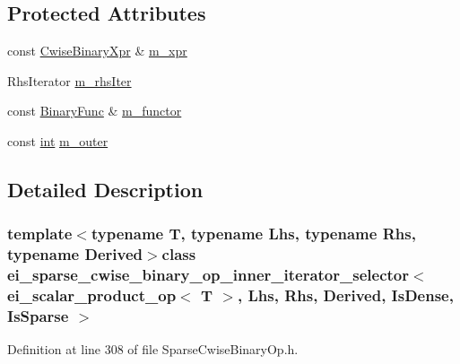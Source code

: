\subsection*{Protected Attributes}
\begin{DoxyCompactItemize}
\item 
const \hyperlink{class_sparse_cwise_binary_op}{Cwise\-Binary\-Xpr} \& \hyperlink{classei__sparse__cwise__binary__op__inner__iterator__selector_3_01ei__scalar__product__op_3_01_tea59c78454e1066b1083644fef716fd4_adb80345e69e67b853b7ccef6e1120792}{m\-\_\-xpr}
\item 
Rhs\-Iterator \hyperlink{classei__sparse__cwise__binary__op__inner__iterator__selector_3_01ei__scalar__product__op_3_01_tea59c78454e1066b1083644fef716fd4_a2799bac446994bca03e1c027dac5d9eb}{m\-\_\-rhs\-Iter}
\item 
const \hyperlink{structei__scalar__product__op}{Binary\-Func} \& \hyperlink{classei__sparse__cwise__binary__op__inner__iterator__selector_3_01ei__scalar__product__op_3_01_tea59c78454e1066b1083644fef716fd4_a1f0ed6bb643c8f9bc6384806606af279}{m\-\_\-functor}
\item 
const \hyperlink{ioapi_8h_a787fa3cf048117ba7123753c1e74fcd6}{int} \hyperlink{classei__sparse__cwise__binary__op__inner__iterator__selector_3_01ei__scalar__product__op_3_01_tea59c78454e1066b1083644fef716fd4_a74e657898daa42e0133160acfd6f5c51}{m\-\_\-outer}
\end{DoxyCompactItemize}


\subsection{Detailed Description}
\subsubsection*{template$<$typename T, typename Lhs, typename Rhs, typename Derived$>$class ei\-\_\-sparse\-\_\-cwise\-\_\-binary\-\_\-op\-\_\-inner\-\_\-iterator\-\_\-selector$<$ ei\-\_\-scalar\-\_\-product\-\_\-op$<$ T $>$, Lhs, Rhs, Derived, Is\-Dense, Is\-Sparse $>$}



Definition at line 308 of file Sparse\-Cwise\-Binary\-Op.\-h.



